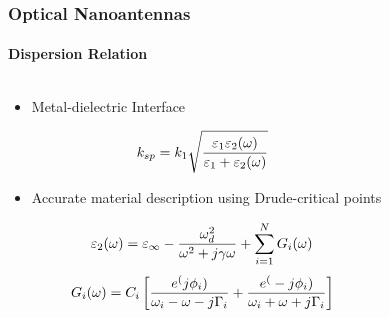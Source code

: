 \documentclass[mathserif,18pt,xcolor=table]{beamer}
\begin{document}
          \begin{frame}
            \frametitle{Optical Nanoantennas}
            \framesubtitle{Dispersion Relation}
            \begin{columns}[T] %
              \begin{column}{.5\textwidth}
                \begin{itemize}
                  \item Metal-dielectric Interface
                \end{itemize}
                \begin{equation} \nonumber
                  k_{sp}=k_{1}\sqrt {\dfrac {\varepsilon_{1}\varepsilon_{2}(\omega)} {\varepsilon_{1} + \varepsilon_{2}(\omega)}}
                  \label{eq:dis_spp}
                \end{equation}
                \begin{itemize}
                  \item Accurate material description using Drude-critical points
                \end{itemize}
                \begin{equation} \nonumber
                    \varepsilon_2(\omega) = \varepsilon_{\infty} - \frac{\omega_{d}^{2}}{\omega^2 + j\gamma \omega} + \sum \limits_{i = 1}^N G_i(\omega)
                  \label{eq:eps_drude_cp}
                  \end{equation}
                  \begin{equation} \nonumber
                      G_i(\omega) = C_i \left[ \frac{e^(j \phi_i)}{\omega_i - \omega - j \Gamma_i} + \frac{e^(-j \phi_i)}{\omega_i + \omega + j \Gamma_i} \right]
                    \label{eq:CP_terms}
                    \end{equation}
              \end{column}
              \begin{column}[T]{.5\textwidth}
                \begin{figure}
                  \vspace*{-2cm}
                  

\end{figure}
\end{column}
\end{columns}
\end{frame}
\end{document}
